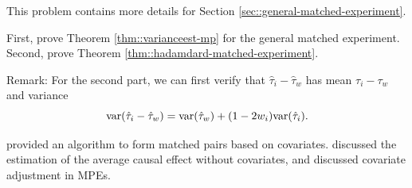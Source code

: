 \begin{HomeworkProblem}\label{exr:7-9}

This problem contains more details for Section  \ref{sec::general-matched-experiment}.


First, prove Theorem  \ref{thm::varianceest-mp} for the general matched experiment.
Second, prove Theorem \ref{thm::hadamdard-matched-experiment}.

Remark: For the second part, we can first verify that $\hat\tau_i -\hat\tau_w$ has mean $\tau_i - \tau_w$ and variance
 \[
 \textup{var}(\hat\tau_i -\hat\tau_w) = \textup{var}(\hat\tau_w ) + (1-2w_i) \textup{var}(\hat\tau_i).
 \]


\end{HomeworkProblem}

\begin{HomeworkProblem}\label{exr:7-10}

\citet{greevy2004optimal} provided an algorithm to form matched pairs based on covariates.
\citet{imai2008variance} discussed the estimation of the average causal effect without covariates,
and
\citet{fogarty2018regression} discussed covariate adjustment in MPEs.



\end{HomeworkProblem}
